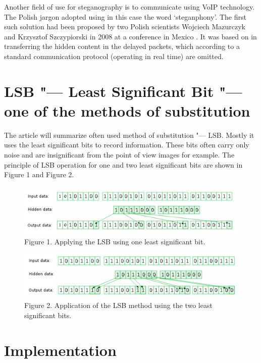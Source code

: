 \documentclass[10pt, a5paper]{article}
\begin{document}
Another field of use for steganography is to communicate using VoIP technology. The Polish jargon adopted using in this case the word ‘steganphony’. The first such solution had been proposed by two Polish scientists Wojciech Mazurczyk and Krzysztof Szczypiorski in 2008 at a conference in Mexico \footnotemark[11]. It was based on in transferring the hidden content in the delayed packets, which according to a standard communication protocol (operating in real time) are omitted.

\section{LSB "--- Least Significant Bit "--- one of the methods of substitution}

The article will summarize often used method of substitution "--- LSB. Mostly it uses the least significant bits to record information. These bits often carry only noise and are insignificant from the point of view images for example. The principle of LSB operation for one and two least significant bits are shown in Figure 1 and Figure 2.

\begin{figure}[h!]
  \centering
  \includegraphics[width=\textwidth]{103_2014_w_Kwiatkowska_lsb1.png}
  Figure 1. Applying the LSB using one least significant bit.
\end{figure}

\begin{figure}[h!]
  \centering
  \includegraphics[width=\textwidth]{103_2014_w_Kwiatkowska_lsb2.png}
  Figure 2. Application of the LSB method using the two least significant bits.
\end{figure}

\section{Implementation}
\end{document}
